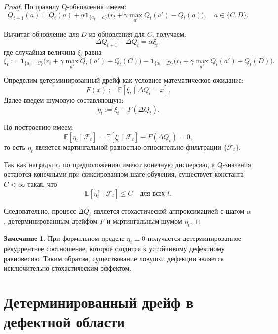 \documentclass[12pt,a4paper]{article}
\theoremstyle{definition}
\newtheorem{remark}{Замечание}
\begin{document}
\begin{proof}
По правилу Q-обновления имеем:
\[
Q_{t+1}(a)
=
Q_t(a)
+
\alpha \mathbf{1}_{\{a_t = a\}}
\bigl(
r_t + \gamma \max_{a'} Q_t(a') - Q_t(a)
\bigr),
\quad a\in\{C,D\}.
\]

Вычитая обновление для $D$ из обновления для $C$, получаем:
\[
\Delta Q_{t+1} - \Delta Q_t
=
\alpha \xi_t,
\]
где случайная величина $\xi_t$ равна
\[
\xi_t :=
\mathbf{1}_{\{a_t = C\}}
\bigl(
r_t + \gamma \max_{a'} Q_t(a') - Q_t(C)
\bigr)
-
\mathbf{1}_{\{a_t = D\}}
\bigl(
r_t + \gamma \max_{a'} Q_t(a') - Q_t(D)
\bigr).
\]

Определим детерминированный дрейф как условное математическое ожидание:
\[
F(x)
:=
\mathbb{E}[\xi_t \mid \Delta Q_t = x].
\]
Далее введём шумовую составляющую:
\[
\eta_t := \xi_t - F(\Delta Q_t).
\]

По построению имеем:
\[
\mathbb{E}[\eta_t \mid \mathcal{F}_t]
=
\mathbb{E}[\xi_t \mid \mathcal{F}_t]
-
F(\Delta Q_t)
=
0,
\]
то есть $\eta_t$ является мартингальной разностью
относительно фильтрации $\{\mathcal{F}_t\}$.

Так как награды $r_t$ по предположению имеют конечную дисперсию,
а Q-значения остаются конечными при фиксированном шаге обучения,
существует константа $C<\infty$ такая, что
\[
\mathbb{E}[\eta_t^2 \mid \mathcal{F}_t] \le C
\quad \text{для всех } t.
\]

Следовательно, процесс $\Delta Q_t$
является стохастической аппроксимацией
с шагом $\alpha$, детерминированным дрейфом $F$
и мартингальным шумом $\eta_t$.
\end{proof}

\begin{remark}
При формальном пределе $\eta_t \equiv 0$
получается детерминированное рекуррентное соотношение,
которое сходится к устойчивому дефектному равновесию.
Таким образом, существование ловушки дефекции
является исключительно стохастическим эффектом.
\end{remark}





\section{Детерминированный дрейф в дефектной области}
\end{document}

